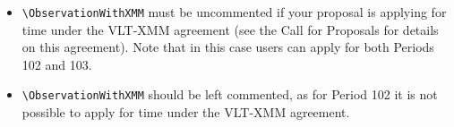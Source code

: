 \documentclass{article}
\begin{document}
\ifodd\period
 \begin{itemize}
  \item \verb|\ObservationWithXMM| must be uncommented if your proposal
   is applying for time under the VLT-XMM agreement (see the Call for
   Proposals for details on this agreement).  Note that in this case
   users can apply for both Periods 102 and 103.
 \end{itemize}
\else
 \begin{itemize}
 \item \verb|\ObservationWithXMM| should be left commented, as for
   Period 102 it is not possible to apply for time under the
   VLT-XMM agreement.
 \end{itemize}
\fi

\end{document}
